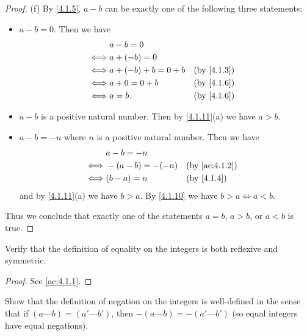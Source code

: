 \begin{proof}{(f)}
  By \cref{4.1.5}, \(a - b\) can be exactly one of the following three statements:
  \begin{itemize}
    \item \(a - b = 0\).
          Then we have
          \begin{align*}
                 & a - b = 0                            \\
            \iff & a + (-b) = 0                         \\
            \iff & a + (-b) + b = 0 + b &  & \by{4.1.3} \\
            \iff & a + 0 = 0 + b        &  & \by{4.1.6} \\
            \iff & a = b.               &  & \by{4.1.6}
          \end{align*}
    \item \(a - b\) is a positive natural number.
          Then by \cref{4.1.11}(a) we have \(a > b\).
    \item \(a - b = -n\) where \(n\) is a positive natural number.
          Then we have
          \begin{align*}
                 & a - b = -n                          \\
            \iff & -(a - b) = -(-n) &  & \by{ac:4.1.2} \\
            \iff & (b - a) = n      &  & \by{4.1.4}
          \end{align*}
          and by \cref{4.1.11}(a) we have \(b > a\).
          By \cref{4.1.10} we have \(b > a \iff a < b\).
  \end{itemize}
  Thus we conclude that exactly one of the statements \(a = b\), \(a > b\), or \(a < b\) is true.
\end{proof}

\exercisesection

\begin{ex}\label{ex:4.1.1}
  Verify that the definition of equality on the integers is both reflexive and symmetric.
\end{ex}

\begin{proof}
  See \cref{ac:4.1.1}.
\end{proof}

\begin{ex}\label{ex:4.1.2}
  Show that the definition of negation on the integers is well-defined in the sense that if \((a \text{---} b) = (a' \text{---} b')\), then \(-(a \text{---} b) = -(a' \text{---} b')\)
  (so equal integers have equal negations).
\end{ex}

